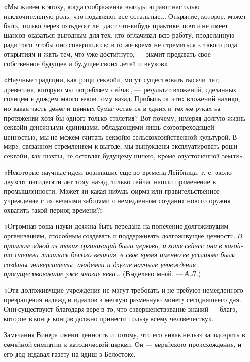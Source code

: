 «Мы  живем   в  эпоху,  когда  соображения   выгоды  играют  настолько
исключительную роль, что подавляют все остальные... Открытие, которое,
может быть, только через пятьдесят лет даст что-нибудь практике, почти
не имеет шансов оказаться выгодным  для тех, кто оплачивал всю работу,
проделанную  ради  того, чтобы  оно  совершилось;  в  то же  время  не
стремиться к такого рода открытиям и жить тем, что уже достигнуто, ---
значит  предавать свое  собственное будущее  и будущее  своих детей  и
внуков».

«Научные традиции,  как рощи  секвойи, могут существовать  тысячи лет;
древесина,  которую  мы  потребляем сейчас,  ---  результат  вложений,
сделанных солнцем  и дождем  много веков тому  назад. Прибыль  от этих
вложений налицо, но какая часть денег  и ценных бумаг остается в одних
и  тех  же  руках  на  протяжении  хотя  бы  одного  только  столетия?
Вот  почему,   измеряя  долгую  жизнь  секвойи   денежными  единицами,
обладающими  лишь  скоропреходящей  ценностью,  мы  не  можем  считать
секвойю сельскохозяйственной культурой.  В мире, связанном стремлением
к выгоде,  мы вынуждены  эксплуатировать рощи  секвойи, как  шахты, не
оставляя будущему ничего, кроме опустошенной земли».

«Некоторые  научные  идеи,  возникшие  еще  во  времена  Лейбница,  т.
е.  около  двухсот пятидесяти  лет  тому  назад, только  сейчас  нашли
применение  в   промышленности.  Может   ли  какая-нибудь   фирма  или
правительственное  учреждение  с  их вечными  заботами  о  немедленном
создании нового оружия охватить такой период времени?»

«Огромная роща  науки должна  быть передана на  попечение долгоживущим
организациям,   способным   создавать  и   поддерживать   долгоживущие
ценности. \emph{В прошлом  одной из таких организаций  была церковь, и
хотя сейчас  она в  какой-то степени лишилась  былого величия,  в свое
время именно ее усилиями были  созданы университеты, академии и другие
научные  учреждения, просуществовавшие  уже  многие века».}  (Выделено
мной. --- \emph{А.Л.})

«Эти  долгоживущие   учреждения  не  могут  требовать   и  не  требуют
немедленного  превращения   надежд  и   идеалов  в   мелкую  разменную
монету  сегодняшнего дня.  Они  существуют благодаря  вере  в то,  что
совершенствование  знаний ---  благо,  которое в  конце концов  должно
принести пользу всему человечеству».

Замечания  Винера  имеют  ценность  и потому,  что  его  никак  нельзя
заподозрить  в  семейной  симпатии   к  католической  церкви.  Он  ---
еврейского  происхождения,  и  его  дед   издавал  газету  на  идиш  в
Белостоке.

